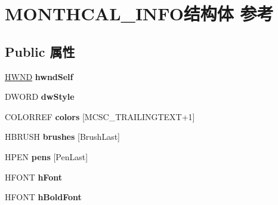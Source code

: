 \hypertarget{struct_m_o_n_t_h_c_a_l___i_n_f_o}{}\section{M\+O\+N\+T\+H\+C\+A\+L\+\_\+\+I\+N\+F\+O结构体 参考}
\label{struct_m_o_n_t_h_c_a_l___i_n_f_o}
\subsection*{Public 属性}
\begin{DoxyCompactItemize}
\item 
\mbox{\label{struct_m_o_n_t_h_c_a_l___i_n_f_o_a5c22061817d10f04c26d38a7b7949e8a}} 
\hyperlink{interfacevoid}{H\+W\+ND} {\bfseries hwnd\+Self}
\item 
\mbox{\label{struct_m_o_n_t_h_c_a_l___i_n_f_o_a05faf84b28a551a88788e0b16e4d32b0}} 
D\+W\+O\+RD {\bfseries dw\+Style}
\item 
\mbox{\label{struct_m_o_n_t_h_c_a_l___i_n_f_o_afc4121bf29d8e29fb181605b3fc6ca03}} 
C\+O\+L\+O\+R\+R\+EF {\bfseries colors} \mbox{[}M\+C\+S\+C\+\_\+\+T\+R\+A\+I\+L\+I\+N\+G\+T\+E\+XT+1\mbox{]}
\item 
\mbox{\label{struct_m_o_n_t_h_c_a_l___i_n_f_o_a4bd27d240083c796e89dd8d8a8bf4f45}} 
H\+B\+R\+U\+SH {\bfseries brushes} \mbox{[}Brush\+Last\mbox{]}
\item 
\mbox{\label{struct_m_o_n_t_h_c_a_l___i_n_f_o_a14075c8d341c4f0245389e79138ed1cf}} 
H\+P\+EN {\bfseries pens} \mbox{[}Pen\+Last\mbox{]}
\item 
\mbox{\label{struct_m_o_n_t_h_c_a_l___i_n_f_o_a9a74ef37c90c1793508970914f1f4f89}} 
H\+F\+O\+NT {\bfseries h\+Font}
\item 
\mbox{\label{struct_m_o_n_t_h_c_a_l___i_n_f_o_ab143aeade7c5d33faec221a778971047}} 
H\+F\+O\+NT {\bfseries h\+Bold\+Font}
\item 
\mbox{\label{struct_m_o_n_t_h_c_a_l___i_n_f_o_ad175ce91369afdb893a7b14a3073a81c}} 

\end{DoxyCompactItemize}

